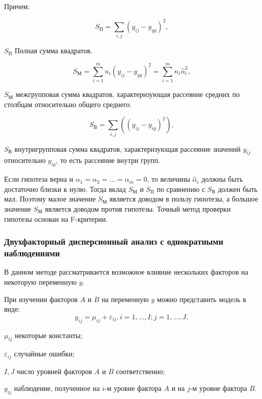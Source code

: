 Причем:

\begin{equation}
\label{eq:sp}
S_П=\sum_{i,j}{\left(y_{ij}-y_{gg}\right)^2},
\end{equation}
\begin{eqexpl}[15mm]
\item{$S_П$} Полная сумма квадратов.
\end{eqexpl}

\begin{equation}
\label{eq:sp}
S_М=\sum_{i=1}^{m}{n_i\left(y_{ij}-y_{gg}\right)^2=\sum_{i=1}^{m}{n_i\widehat{\alpha}_i^2}},
\end{equation}
\begin{eqexpl}[15mm]
\item{$S_М$} межгрупповая сумма квадратов, характеризующая рассеяние средних по столбцам относительно общего среднего.
\end{eqexpl}

\begin{equation}
\label{eq:sv}
S_В=\sum_{i,j}{\left(\left(y_{ij}-y_{ig}\right)^2\right)},
\end{equation}
\begin{eqexpl}[15mm]
\item{$S_В$} внутригрупповая сумма квадратов, характеризующая рассеяние значений $y_{ij}$ относительно $y_{ig}$, то есть рассеяние внутри групп.
\end{eqexpl}

Если гипотеза верна и $\alpha_1=\alpha_2=...=\alpha_m=0$, то величины $\widehat{\alpha}_i$ должны быть достаточно близки к нулю. Тогда вклад $S_М$ и $S_П$ по сравнению с $S_В$ должен быть мал. Поэтому малое значение $S_М$ является доводом в пользу гипотезы, а большое значение $S_М$ является доводом против гипотезы. Точный метод проверки гипотезы основан на F-критерии. \cite{disperMethod}

\subsubsection{Двухфакторный дисперсионный анализ с однократными наблюдениями}
В данном методе рассматривается возможное влияние нескольких факторов на некоторую переменную $y$.

При изучении факторов $A$ и $B$ на переменную $y$ можно представить модель в виде:
\begin{equation}
\label{eq:modelTwoFactors}
y_{ij}=\mu_{ij}+\varepsilon_{ij},i=1,...,I;j=1,...,J,
\end{equation}
\begin{eqexpl}[15mm]
\item{$\mu_{ij}$} некоторые константы;
\item{$\varepsilon_{ij}$} случайные ошибки;
\item{$I,J$} число уровней факторов $A$ и $B$ соответственно;
\item{$y_{ij}$} наблюдение, полученное на $i$-м уровне фактора $A$ и на $j$-м уровне фактора $B$.
\end{eqexpl}

